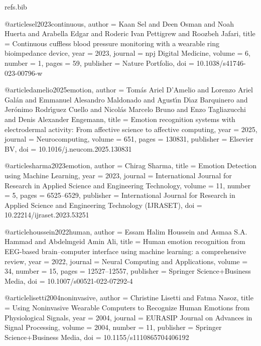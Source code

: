 \begin{filecontents*}[overwrite]{refs.bib}

@article{sel2023continuous,
  author = {Kaan Sel and Deen Osman and Noah Huerta and Arabella Edgar and Roderic Ivan Pettigrew and Roozbeh Jafari},
  title = {{Continuous cuffless blood pressure monitoring with a wearable ring bioimpedance device}},
  year = {2023},
  journal = {npj Digital Medicine},
  volume = {6},
  number = {1},
  pages = {59},
  publisher = {Nature Portfolio},
  doi = {10.1038/s41746-023-00796-w}
}

@article{damelio2025emotion,
  author = {Tom{\'a}s Ariel D'Amelio and Lorenzo Ariel Gal{\'a}n and Emmanuel Alesandro Maldonado and Agust{\'\i}n D{\'\i}az Barquinero and Jer{\'o}nimo Rodr{\'\i}guez Cuello and Nicol{\'a}s Marcelo Bruno and Enzo Tagliazucchi and Denis Alexander Engemann},
  title = {{Emotion recognition systems with electrodermal activity: From affective science to affective computing}},
  year = {2025},
  journal = {Neurocomputing},
  volume = {651},
  pages = {130831},
  publisher = {Elsevier BV},
  doi = {10.1016/j.neucom.2025.130831}
}

@article{sharma2023emotion,
  author = {Chirag Sharma},
  title = {{Emotion Detection using Machine Learning}},
  year = {2023},
  journal = {International Journal for Research in Applied Science and Engineering Technology},
  volume = {11},
  number = {5},
  pages = {6525--6529},
  publisher = {International Journal for Research in Applied Science and Engineering Technology (IJRASET)},
  doi = {10.22214/ijraset.2023.53251}
}

@article{houssein2022human,
  author = {Essam Halim Houssein and Asmaa S.A. Hammad and Abdelmgeid Amin Ali},
  title = {{Human emotion recognition from EEG-based brain--computer interface using machine learning: a comprehensive review}},
  year = {2022},
  journal = {Neural Computing and Applications},
  volume = {34},
  number = {15},
  pages = {12527--12557},
  publisher = {Springer Science+Business Media},
  doi = {10.1007/s00521-022-07292-4}
}

@article{lisetti2004noninvasive,
  author = {Christine Lisetti and Fatma Nasoz},
  title = {{Using Noninvasive Wearable Computers to Recognize Human Emotions from Physiological Signals}},
  year = {2004},
  journal = {EURASIP Journal on Advances in Signal Processing},
  volume = {2004},
  number = {11},
  publisher = {Springer Science+Business Media},
  doi = {10.1155/s1110865704406192}
}


\end{filecontents*}
